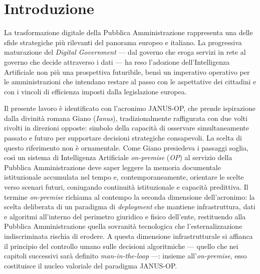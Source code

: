 \chapter*{Introduzione}

La trasformazione digitale della Pubblica Amministrazione rappresenta una delle sfide strategiche più rilevanti del panorama europeo e italiano. La progressiva maturazione del \textit{Digital Government} --- dal governo che eroga servizi in rete al governo che decide attraverso i dati --- ha reso l'adozione dell'Intelligenza Artificiale non più una prospettiva futuribile, bensì un imperativo operativo per le amministrazioni che intendano restare al passo con le aspettative dei cittadini e con i vincoli di efficienza imposti dalla legislazione europea.

Il presente lavoro è identificato con l'acronimo JANUS-OP, che prende ispirazione dalla divinità romana Giano (\textit{Ianus}), tradizionalmente raffigurata con due volti rivolti in direzioni opposte: simbolo della capacità di osservare simultaneamente passato e futuro per supportare decisioni strategiche consapevoli. La scelta di questo riferimento non è ornamentale. Come Giano presiedeva i passaggi soglia, così un sistema di Intelligenza Artificiale \textit{on-premise} (\textit{OP}) al servizio della Pubblica Amministrazione deve saper leggere la memoria documentale istituzionale accumulata nel tempo e, contemporaneamente, orientare le scelte verso scenari futuri, coniugando continuità istituzionale e capacità predittiva. Il termine \textit{on-premise} richiama al contempo la seconda dimensione dell'acronimo: la scelta deliberata di un paradigma di \textit{deployment} che mantiene infrastruttura, dati e algoritmi all'interno del perimetro giuridico e fisico dell'ente, restituendo alla Pubblica Amministrazione quella sovranità tecnologica che l'esternalizzazione indiscriminata rischia di erodere. A questa dimensione infrastrutturale si affianca il principio del controllo umano sulle decisioni algoritmiche --- quello che nei capitoli successivi sarà definito \textit{man-in-the-loop} ---: insieme all'\textit{on-premise}, esso costituisce il nucleo valoriale del paradigma JANUS-OP.

